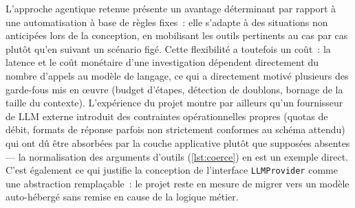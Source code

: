 L'approche agentique retenue présente un avantage déterminant par rapport à
une automatisation à base de règles fixes~: elle s'adapte à des situations
non anticipées lors de la conception, en mobilisant les outils pertinents au
cas par cas plutôt qu'en suivant un scénario figé. Cette flexibilité a
toutefois un coût~: la latence et le coût monétaire d'une investigation
dépendent directement du nombre d'appels au modèle de langage, ce qui a
directement motivé plusieurs des garde-fous mis en œuvre (budget d'étapes,
détection de doublons, bornage de la taille du contexte). L'expérience du
projet montre par ailleurs qu'un fournisseur de LLM externe introduit des
contraintes opérationnelles propres (quotas de débit, formats de réponse
parfois non strictement conformes au schéma attendu) qui ont dû être
absorbées par la couche applicative plutôt que supposées absentes — la
normalisation des arguments d'outils (\cref{lst:coerce}) en est un exemple
direct. C'est également ce qui justifie la conception de l'interface
\texttt{LLMProvider} comme une abstraction remplaçable~: le projet reste en
mesure de migrer vers un modèle auto-hébergé sans remise en cause de la
logique métier.
